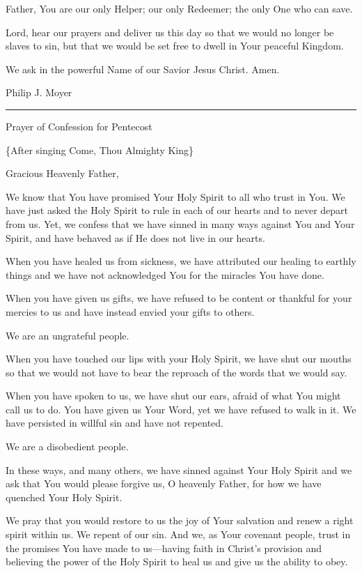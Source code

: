 \documentclass[]{book}
\begin{document}
Father, You are our only Helper; our only Redeemer; the only One who can save.

Lord, hear our prayers and deliver us this day so that we would no longer be slaves to sin, but that we would be set free to dwell in Your peaceful Kingdom.

We ask in the powerful Name of our Savior Jesus Christ. Amen.

Philip J. Moyer

\begin{center}\rule{0.5\linewidth}{\linethickness}\end{center}

Prayer of Confession for Pentecost

\{After singing Come, Thou Almighty King\}

Gracious Heavenly Father,

We know that You have promised Your Holy Spirit to all who trust in You. We have just asked the Holy Spirit to rule in each of our hearts and to never depart from us. Yet, we confess that we have sinned in many ways against You and Your Spirit, and have behaved as if He does not live in our hearts.

When you have healed us from sickness, we have attributed our healing to earthly things and we have not acknowledged You for the miracles You have done.

When you have given us gifts, we have refused to be content or thankful for your mercies to us and have instead envied your gifts to others.

We are an ungrateful people.

When you have touched our lips with your Holy Spirit, we have shut our mouths so that we would not have to bear the reproach of the words that we would say.

When you have spoken to us, we have shut our ears, afraid of what You might call us to do. You have given us Your Word, yet we have refused to walk in it. We have persisted in willful sin and have not repented.

We are a disobedient people.

In these ways, and many others, we have sinned against Your Holy Spirit and we ask that You would please forgive us, O heavenly Father, for how we have quenched Your Holy Spirit.

We pray that you would restore to us the joy of Your salvation and renew a right spirit within us. We repent of our sin. And we, as Your covenant people, trust in the promises You have made to us---having faith in Christ's provision and believing the power of the Holy Spirit to heal us and give us the ability to obey.
\end{document}
